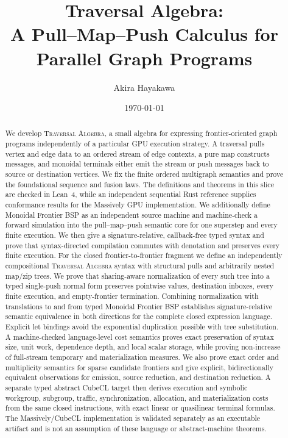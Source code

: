 \documentclass[11pt]{article}
\title{Traversal Algebra:\\A Pull--Map--Push Calculus for Parallel Graph Programs}
\author{Akira Hayakawa}
\date{\today}
\newcommand{\TA}{\textnormal{\textsc{Traversal Algebra}}}
\begin{document}
\maketitle

\begin{abstract}
We develop \TA, a small algebra for expressing frontier-oriented graph
programs independently of a particular GPU execution strategy.  A traversal
pulls vertex and edge data to an ordered stream of edge contexts, a pure map
constructs messages, and monoidal terminals either emit the stream or push
messages back to source or destination vertices.  We fix the finite
ordered multigraph semantics and prove the foundational sequence and fusion
laws.  The definitions and theorems in this slice are checked in Lean~4, while
an independent sequential Rust reference supplies conformance results for the
Massively GPU implementation.  We additionally define Monoidal Frontier BSP
as an independent source machine and machine-check a forward simulation into the
pull--map--push semantic core for one superstep and every finite execution.
We then give a signature-relative, callback-free typed syntax and prove that
syntax-directed compilation commutes with denotation and preserves every
finite execution.  For the closed frontier-to-frontier fragment we define an
independently compositional \TA{} syntax with structural pulls and arbitrarily
nested map/zip trees.  We prove that sharing-aware normalization of every such
tree into a typed single-push normal form preserves pointwise values,
destination inboxes, every finite execution, and empty-frontier termination.
Combining normalization with translations to and from typed Monoidal Frontier
BSP establishes signature-relative semantic equivalence in both directions
for the complete closed expression language.  Explicit let bindings avoid the
exponential duplication possible with tree substitution.  A machine-checked
language-level cost semantics proves exact preservation of syntax size, unit
work, dependence depth, and local scalar storage, while proving non-increase
of full-stream temporary and materialization measures.  We also prove exact
order and multiplicity semantics for sparse candidate frontiers and give
explicit, bidirectionally equivalent observations for emission, source
reduction, and destination reduction.  A separate typed abstract CubeCL target
then derives execution and symbolic workgroup, subgroup, traffic,
synchronization, allocation, and materialization costs from the same closed
instructions, with exact linear or quasilinear terminal formulas.  The
Massively/CubeCL implementation is validated separately as an executable
artifact and is not an assumption of these language or abstract-machine
theorems.
\end{abstract}










\end{document}
